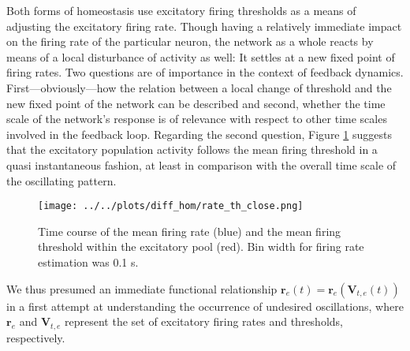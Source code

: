 \documentclass[10pt,a4paper]{article}
\begin{document}
Both forms of homeostasis use excitatory firing thresholds as a means of adjusting the excitatory firing rate. Though having a relatively immediate impact on the firing rate of the particular neuron, the network as a whole reacts by means of a local disturbance of activity as well: It settles at a new fixed point of firing rates. Two questions are of importance in the context of feedback dynamics. First---obviously---how the relation between a local change of threshold and the new fixed point of the network can be described and second, whether the time scale of the network's response is of relevance with respect to other time scales involved in the feedback loop. Regarding the second question, Figure \ref{rate_th_close} suggests that the excitatory population activity follows the mean firing threshold in a quasi instantaneous fashion, at least in comparison with the overall time scale of the oscillating pattern.
\begin{figure}
\begin{center}
\texttt{[image: ../../plots/diff\_hom/rate\_th\_close.png]}
\end{center}
\caption[Time course of the mean firing rate and the mean firing threshold within the excitatory pool]{Time course of the mean firing rate (blue) and the mean firing threshold within the excitatory pool (red). Bin width for firing rate estimation was 0.1 s.}
\label{rate_th_close}
\end{figure}
We thus presumed an immediate functional relationship $\mathbf{r}_e (t) = \mathbf{r}_e (\mathbf{V}_{t,e} (t))$ in a first attempt at understanding the occurrence of undesired oscillations, where $\mathbf{r}_e$ and $\mathbf{V}_{t,e}$ represent the set of excitatory firing rates and thresholds, respectively.
\end{document}
